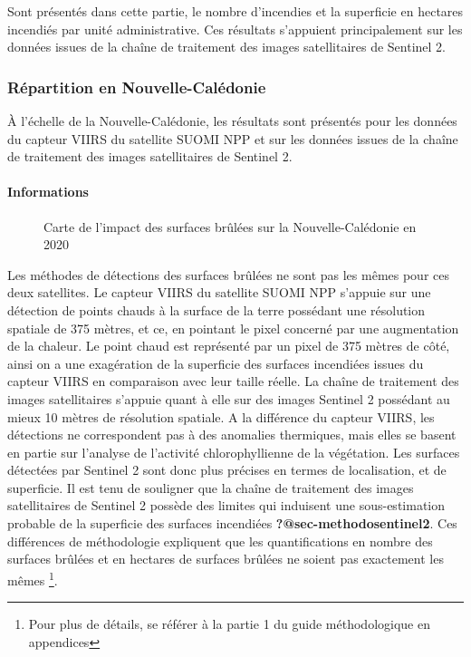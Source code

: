 \documentclass[
  11pt,
  letterpaper,
]{scrreprt}
\let\oldparagraph\paragraph
\renewcommand{\paragraph}[1]{\oldparagraph{#1}\mbox{}}
\begin{document}
Sont présentés dans cette partie, le nombre d'incendies et la superficie
en hectares incendiés par unité administrative. Ces résultats s'appuient
principalement sur les données issues de la chaîne de traitement des
images satellitaires de Sentinel 2.

\subsubsection{Répartition en
Nouvelle-Calédonie}\label{ruxe9partition-en-nouvelle-caluxe9donie}

À l'échelle de la Nouvelle-Calédonie, les résultats sont présentés pour
les données du capteur VIIRS du satellite SUOMI NPP et sur les données
issues de la chaîne de traitement des images satellitaires de Sentinel
2.

\paragraph{Informations}\label{informations}

\begin{figure}[H]


\caption{\label{fig-zb-nc}Carte de l'impact des surfaces brûlées sur la
Nouvelle-Calédonie en 2020}

\end{figure}%

Les méthodes de détections des surfaces brûlées ne sont pas les mêmes
pour ces deux satellites. Le capteur VIIRS du satellite SUOMI NPP
s'appuie sur une détection de points chauds à la surface de la terre
possédant une résolution spatiale de 375 mètres, et ce, en pointant le
pixel concerné par une augmentation de la chaleur. Le point chaud est
représenté par un pixel de 375 mètres de côté, ainsi on a une
exagération de la superficie des surfaces incendiées issues du capteur
VIIRS en comparaison avec leur taille réelle. La chaîne de traitement
des images satellitaires s'appuie quant à elle sur des images Sentinel 2
possédant au mieux 10 mètres de résolution spatiale. A la différence du
capteur VIIRS, les détections ne correspondent pas à des anomalies
thermiques, mais elles se basent en partie sur l'analyse de l'activité
chlorophyllienne de la végétation. Les surfaces détectées par Sentinel 2
sont donc plus précises en termes de localisation, et de superficie. Il
est tenu de souligner que la chaîne de traitement des images
satellitaires de Sentinel 2 possède des limites qui induisent une
sous-estimation probable de la superficie des surfaces incendiées
\textbf{?@sec-methodosentinel2}. Ces différences de méthodologie
expliquent que les quantifications en nombre des surfaces brûlées et en
hectares de surfaces brûlées ne soient pas exactement les mêmes
\footnote{Pour plus de détails, se référer à la partie 1 du guide
  méthodologique en appendices}.
\end{document}

